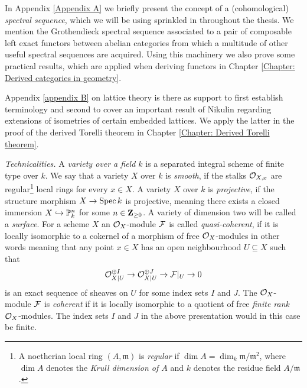 

In Appendix \ref{Appendix A} we briefly present the concept of a (cohomological) \emph{spectral sequence}, which we will be using sprinkled in throughout the thesis. We mention the Grothendieck spectral sequence associated to a pair of composable left exact functors between abelian categories from which a multitude of other useful spectral sequences are acquired. Using this machinery we also prove some practical results, which are applied when deriving functors in Chapter \ref{Chapter: Derived categories in geometry}. 

Appendix \ref{appendix B} on lattice theory is there as support to first establish terminology and second to cover an important result of Nikulin \cite{Nikulin1980} regarding extensions of isometries of certain embedded lattices. We apply the latter in the proof of the derived Torelli theorem in Chapter \ref{Chapter: Derived Torelli theorem}. 

\vspace{0.3cm}
\noindent
\textsl{Technicalities.}
A \emph{variety over a field $k$} is a separated integral scheme of finite type over $k$. We say that a variety $X$ over $k$ is \emph{smooth}, if the stalks ${\mathcal{O}_{X, x}}$ are regular\footnote{A noetherian local ring $(A, \mathfrak{m})$ is \emph{regular} if $\dim A = \dim_k \mathfrak{m}/\mathfrak{m}^2$, where $\dim A$ denotes the \emph{Krull dimension of $A$} and $k$ denotes the residue field $A/\mathfrak{m}$.} local rings for every $x \in X$. A variety $X$ over $k$ is \emph{projective}, if the structure morphism $X \to \operatorname{Spec}k$ is projective, meaning there exists a closed immersion $X \hookrightarrow \mathbb P^n_k$ for some $n \in \mathbf Z_{\geq 0}$. A variety of dimension two will be called a \emph{surface}. For a scheme $X$ an ${\mathcal{O}_{X}}$-module $\mathcal F$ is called \emph{quasi-coherent}, if it is locally isomorphic to a cokernel of a morphism of free ${\mathcal{O}_{X}}$-modules in other words meaning that any point $x \in X$ has an open neighbourhood $U \subseteq X$ such that 
\[
    \mathcal O_{X|U}^{\oplus I} \to \mathcal O_{X|U}^{\oplus J} \to \mathcal F|_U \to 0
\]
is an exact sequence of sheaves on $U$ for some index sets $I$ and $J$. The ${\mathcal{O}_{X}}$-module $\mathcal F$ is \emph{coherent} if it is locally isomorphic to a quotient of free \emph{finite rank} ${\mathcal{O}_{X}}$-modules. The index sets $I$ and $J$ in the above presentation would in this case be finite.
